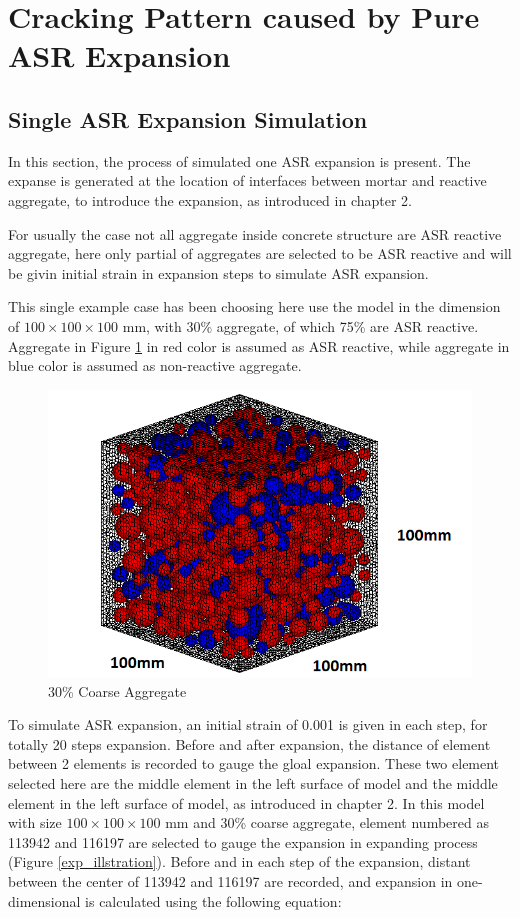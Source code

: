\clearpage
\section{Cracking Pattern caused by Pure ASR Expansion}


\subsection{Single ASR Expansion Simulation}


In this section, the process of simulated one ASR expansion is present. The expanse is generated at the location of interfaces between mortar and reactive aggregate, to introduce the expansion, as introduced in chapter 2.

For usually the case not all aggregate inside concrete structure are ASR reactive aggregate, here only partial of aggregates are selected to be ASR reactive and will be givin initial strain in expansion steps to simulate ASR expansion.

This single example case has been choosing here use the model in the dimension of $100 \times 100 \times 100$ mm, with 30\% aggregate, of which 75\% are ASR reactive. Aggregate in Figure \ref{fig:A30_modelll} in red color is assumed as ASR reactive, while aggregate in blue color is assumed as non-reactive aggregate.

  \begin{figure}[ht!]
  \centering
  \includegraphics[width=.3\linewidth]{Files/Aggregate/A30P75.png}
    \caption{30\% Coarse Aggregate}
    \label{fig:A30_modelll}
  \end{figure}

To simulate ASR expansion, an initial strain of 0.001 is given in each step, for totally 20 steps expansion. Before and after expansion, the distance of element between 2 elements is recorded to gauge the gloal expansion. These two element selected here are the middle element in the left surface of model and the middle element in the left surface of model, as introduced in chapter 2. In this model with size $100 \times 100 \times 100$ mm and 30\% coarse aggregate, element numbered as 113942 and 116197 are selected to gauge the expansion in expanding process (Figure \ref{exp_illstration}). Before and in each step of the expansion, distant between the center of 113942 and 116197 are recorded, and expansion in one-dimensional is calculated using the following equation:



